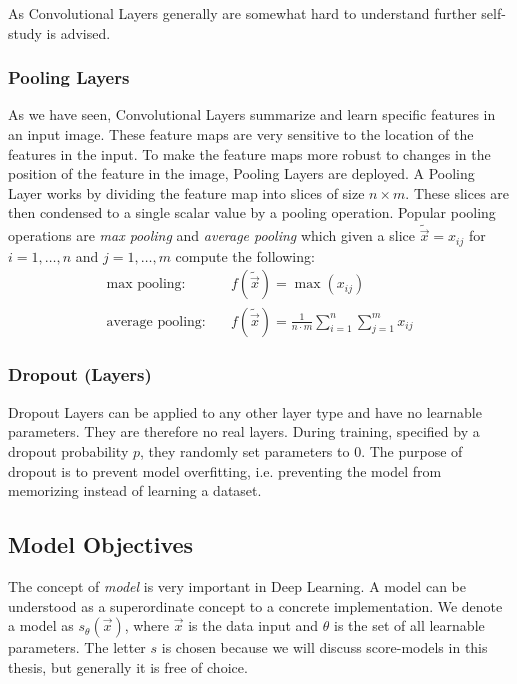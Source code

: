 As Convolutional Layers generally are somewhat hard to understand further self-study is advised.
%
\subsubsection{Pooling Layers}
As we have seen, Convolutional Layers summarize and learn specific features in an input image. These feature maps are very sensitive to the location of the features in the input. To make the feature maps more robust to changes in the position of the feature in the image, Pooling Layers are deployed. A Pooling Layer works by dividing the feature map into slices of size $n\times m$. These slices are then condensed to a single scalar value by a pooling operation. Popular pooling operations are \textit{max pooling} and \textit{average pooling} which given a slice $\tilde{\vec{x}}=x_{ij}$ for $i=1,\dots,n$ and $j=1,\dots,m$ compute the following:
%
\begin{align}
    \text{max pooling:}\quad&f(\tilde{\vec{x}})=\max(x_{ij})\\
    \text{average pooling:}\quad&f(\tilde{\vec{x}})=\frac{1}{n\cdot m}\sum_{i=1}^n\sum_{j=1}^mx_{ij}
\end{align}
%
\subsubsection{Dropout (Layers)}
Dropout Layers can be applied to any other layer type and have no learnable parameters. They are therefore no real layers. During training, specified by a dropout probability $p$, they randomly set parameters to $0$. The purpose of dropout is to prevent model overfitting, i.e. preventing the model from memorizing instead of learning a dataset.
%
\subsection{Model Objectives}
The concept of \textit{model} is very important in Deep Learning. A model can be understood as a superordinate concept to a concrete implementation. We denote a model as $s_\theta(\vec{x})$, where $\vec{x}$ is the data input and $\theta$ is the set of all learnable parameters. The letter $s$ is chosen because we will discuss score-models in this thesis, but generally it is free of choice.

